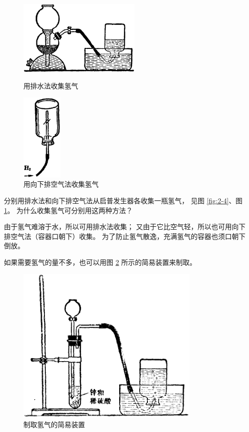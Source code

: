 \begin{figure}[htbp]
    \centering
    \begin{minipage}[b]{7cm}
        \centering
        \includegraphics[width=6cm]{../pic/czhx1-ch2-4}
        \caption{用排水法收集氢气}\label{fig:2-4}
    \end{minipage}
    \qquad
    \begin{minipage}[b]{7cm}
        \centering
        \includegraphics[width=2cm]{../pic/czhx1-ch2-5}
        \caption{用向下排空气法收集氢气}\label{fig:2-5}
    \end{minipage}
\end{figure}


\begin{shiyan}
    分别用排水法和向下排空气法从启普发生器各收集一瓶氢气，
    见图 \ref{fig:2-4}、图 \ref{fig:2-5}。
    为什么收集氢气可分别用这两种方法？
\end{shiyan}


由于氢气难溶于水，所以可用排水法收集；
又由于它比空气轻，所以也可用向下排空气法（容器口朝下）收集。
为了防止氢气散逸，充满氢气的容器也须口朝下倒放。

如果需要氢气的量不多，也可以用图 \ref{fig:2-6} 所示的简易装置来制取。

\begin{figure}[htbp]
    \centering
    \includegraphics[width=9cm]{../pic/czhx1-ch2-6}
    \caption{制取氢气的简易装置}\label{fig:2-6}
\end{figure}

